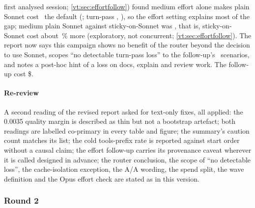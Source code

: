 \begin{enumerate}[leftmargin=1.6em]
    first analysed session; \cref{vt:sec:effortfollow}) found medium effort alone makes
    plain Sonnet cost \EcRatio\X\ the default (\EcCI; turn-pass \EcQual, \EcQualCI), so the effort setting explains
    most of the gap; medium plain Sonnet against sticky-on-Sonnet was \EcSecRatio, that is, sticky-on-Sonnet cost
    about \EcSecGapPct\,\% more (exploratory, not concurrent; \cref{vt:sec:effortfollow}). The report now says this
    campaign shows no benefit of the router beyond the decision to use Sonnet, scopes ``no detectable turn-pass
    loss'' to the follow-up's \EcScen\ scenarios, and notes a post-hoc hint of a loss on docs, explain and review work.
    The follow-up cost \$\EcSpend.
\end{enumerate}

\paragraph{Re-review} A second reading of the revised report asked for text-only fixes, all applied: the 0.0035
quality margin is described as thin but not a bootstrap artefact; both readings are labelled co-primary in every table
and figure; the summary's caution count matches its list; the cold tools-prefix rate is reported against start order
without a causal claim; the effort follow-up carries its provenance caveat wherever it is called designed in advance;
the router conclusion, the scope of ``no detectable loss'', the cache-isolation exception, the A/A wording, the
spend split, the wave definition and the Opus effort check are stated as in this version.

\subsubsection*{Round 2}\label{vt:app:round2}


